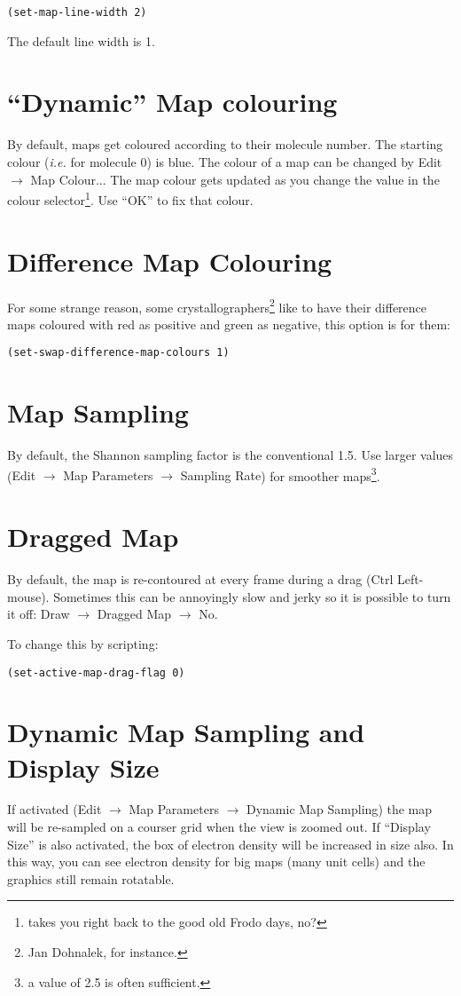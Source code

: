 \documentclass{book}
\begin{document}
\texttt{(set-map-line-width 2)}

The default line width is 1.

\section{``Dynamic'' Map colouring}
 By default, maps get coloured according to
their molecule number.  The starting colour (\emph{i.e.} for molecule
0) is blue.  The colour of a map can be changed by \textsf{Edit
  $\rightarrow$ Map Colour..}. The map colour gets updated as you
change the value in the colour selector\footnote{takes you right back
  to the good old Frodo days, no?}.  Use ``OK'' to fix that colour.

\section{Difference Map Colouring}
For some strange reason, some crystallographers\footnote{Jan Dohnalek,
  for instance.} like to have their difference maps coloured with red
as positive and green as negative, this option is for them:

\texttt{(set-swap-difference-map-colours 1)}


\section{Map Sampling}
By default, the Shannon sampling factor is the conventional 1.5.  Use
larger values (\textsf{Edit $\rightarrow$ Map Parameters $\rightarrow$
  Sampling Rate}) for smoother maps\footnote{a value of 2.5 is often
  sufficient.}.

\section{Dragged Map}
By default, the map is re-contoured at every frame during a drag (Ctrl
Left-mouse).  Sometimes this can be annoyingly slow and jerky so it is
possible to turn it off: \textsf{Draw $\rightarrow$ Dragged Map
  $\rightarrow$ No}.

To change this by scripting:

\texttt{(set-active-map-drag-flag 0)}


\section{Dynamic Map Sampling and Display Size}
If activated (\textsf{Edit $\rightarrow$ Map Parameters $\rightarrow$
  Dynamic Map Sampling}) the map will be re-sampled on a courser grid
when the view is zoomed out.  If ``Display Size'' is also activated,
the box of electron density will be increased in size also.  In this
way, you can see electron density for big maps (many
unit cells) and the graphics still remain rotatable.
\end{document}
